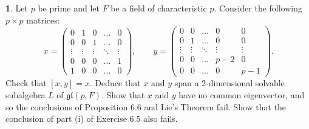 \documentclass[12pt]{article}
\newcommand{\gl}{\mathfrak{gl}}
\theoremstyle{definition}
\newtheorem{ex}{}
\begin{document}
\begin{ex}
	Let $p$ be prime and let $F$ be a field of characteristic $p$.
	Consider the following $p \times p$ matrices: \begin{equation*}
		x = \begin{pmatrix}
			0      & 1      & 0      & \dots  & 0      \\
			0      & 0      & 1      & \dots  & 0      \\
			\vdots & \vdots & \vdots & \ddots & \vdots \\
			0      & 0      & 0      & \dots  & 1      \\
			1      & 0      & 0      & \dots  & 0
		\end{pmatrix}, \hspace{2em}
		y = \begin{pmatrix}
			0      & 0      & \dots  & 0      & 0      \\
			0      & 1      & \dots  & 0      & 0      \\
			\vdots & \vdots & \ddots & \vdots & \vdots \\
			0      & 0      & \dots  & p-2    & 0      \\
			0      & 0      & \dots  & 0      & p-1
		\end{pmatrix}.
	\end{equation*}
	Check that $[x,y] = x$.
	Deduce that $x$ and $y$ span a 2-dimensional solvable subalgebra $L$ of $\gl(p, F)$.
	Show that $x$ and $y$ have no common eigenvector, and so the conclusions of Proposition 6.6 and Lie's Theorem fail.
	Show that the conclusion of part (i) of Exercise 6.5 also fails.
\end{ex}
\end{document}
